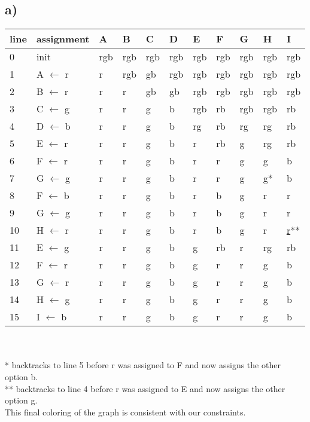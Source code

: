 \documentclass[a4paper]{article}
\begin{document}
	\subsection*{a)}
	\begin{tabular}{l | l || l | l | l | l | l | l | l | l | l }
		line & assignment & A & B & C & D & E & F & G & H & I  \\ \hline
		0& init & rgb & rgb & rgb & rgb & rgb & rgb & rgb & rgb & rgb \\ \hline
		1 & A $\leftarrow$ r & r  & rgb & gb & rgb & rgb & rgb & rgb & rgb & rgb  \\ \hline
		2 & B $\leftarrow$ r & r & r & gb & gb & rgb  & rgb & rgb & rgb & rgb  \\ \hline
		3 & C $\leftarrow$ g & r & r & g & b & rgb & rb & rgb & rgb & rb \\ \hline
		4 & D $\leftarrow$ b & r & r & g & b & rg & rb & rg & rg & rb \\ \hline
		5 & E $\leftarrow$ r & r & r & g & b & r & rb & g & rg & rb \\ \hline
		6 & F $\leftarrow$ r & r & r & g & b & r & r & g & g & b  \\ \hline
		7 & G $\leftarrow$ g & r & r & g & b & r & r & g & \underline{g}* & b \\ \hline
		8 & F $\leftarrow$ b & r & r & g & b & r & b & g & r & r\\ \hline
		9 & G $\leftarrow$ g & r & r & g & b & r & b & g & r & r \\ \hline
		10 & H $\leftarrow$ r & r & r & g & b & r & b & g & r & \underline{r}** \\ \hline
		11 & E $\leftarrow$ g & r & r & g & b & g & rb & r & rg & rb \\ \hline
		12 & F $\leftarrow$ r & r & r & g & b & g & r & r & g & b \\ \hline
		13 & G $\leftarrow$ r & r & r & g & b & g & r & r & g & b \\ \hline
		14 & H $\leftarrow$ g & r & r & g & b & g & r & r & g & b \\ \hline
		15 & I $\leftarrow$ b & r & r & g & b & g & r & r & g & b \\ \hline
	\end{tabular}\\ \\
	* backtracks to line 5 before r was assigned to F and now assigns the other option b.\\
	** backtracks to line 4 before r was assigned to E and now assigns the other option g.\\
	This final coloring of the graph is consistent with our constraints.
\end{document}
